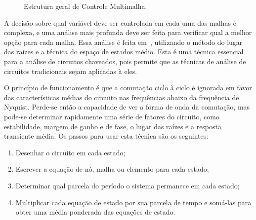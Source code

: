     \begin{figure}[htb]
        \renewcommand\figurename{Fig.}
        \caption{Estrutura geral de Controle Multimalha.}
        \label{fig:multiloop}
    \end{figure}

    A decisão sobre qual variável deve ser controlada em cada uma das malhas é complexa,
    e uma análise mais profunda deve ser feita para verificar qual a melhor
    opção para cada malha. Essa análise é feita em~\cite{ref:NASER}, utilizando o
    método do lugar das raízes e a técnica do espaço de estados médio. Esta é uma técnica
    essencial para a análise de circuitos chaveados, pois permite que as técnicas de
    análise de circuitos tradicionais sejam aplicadas à eles.

    O princípio de funcionamento é que a comutação ciclo à ciclo é ignorada em
    favor das características médias do circuito nas frequências abaixo da
    frequência de Nyquist. Perde-se então a capacidade de ver a forma de onda
    da comutação, mas pode-se determinar rapidamente uma série de fatores
    do circuito, como estabilidade, margem de ganho e de fase, o lugar das
    raízes e a resposta transiente média. Os passos para usar esta técnica são
    os seguintes:

    \begin{enumerate}
        \item Desenhar o circuito em cada estado;
        \item Escrever a equação de nó, malha ou elemento para cada estado;
        \item Determinar qual parcela do período o sistema permanece em cada estado;
        \item Multiplicar cada equação de estado por sua parcela de tempo e somá-las
            para obter uma média ponderada das equações de estado.
    \end{enumerate}

